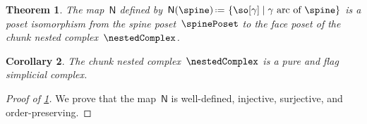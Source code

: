 \documentclass{amsart}
\newtheorem{theorem}{Theorem}[section]
\newtheorem{corollary}[theorem]{Corollary}
\theoremstyle{definition}
\newcommand{\set}[2]{\left\{ #1 \;\middle|\; #2 \right\}} %
\newcommand{\eqdef}{\mbox{\,\raisebox{0.2ex}{\scriptsize\ensuremath{\mathrm:}}\ensuremath{=}\,}} %
\newcommand{\spineToNested}{\mathsf{N}} %
\begin{document}
\begin{theorem}
  \label{thm:spineToNested}
  The map~$\spineToNested$ defined by~$\spineToNested(\spine) \eqdef \set{\so[\gamma]}{\gamma \text{ arc of } \spine}$ is a poset isomorphism from the spine poset~$\spinePoset$ to the face poset of the chunk nested complex~$\nestedComplex$.
\end{theorem}

\begin{corollary}
  The chunk nested complex~$\nestedComplex$ is a pure and flag simplicial complex.
\end{corollary}

\begin{proof}[Proof of \cref{thm:spineToNested}]
  We prove that the map~$\spineToNested$ is well-defined, injective, surjective, and order-preserving.
  

\end{proof}
\end{document}
